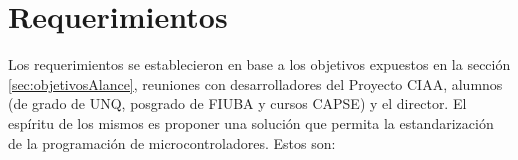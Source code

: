\section{Requerimientos}
\label{sec:requerimientos}




Los requerimientos se establecieron en base a los objetivos expuestos en la sección \ref{sec:objetivosAlance}, reuniones con desarrolladores del Proyecto CIAA, alumnos (de grado de UNQ, posgrado de FIUBA y cursos CAPSE) y el director. El espíritu de los mismos es proponer una solución que permita la estandarización de la programación de microcontroladores. Estos son:

